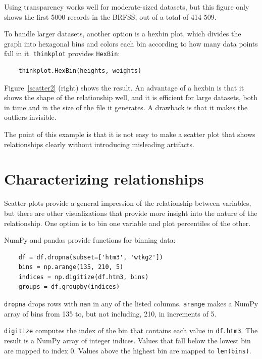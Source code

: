 \documentclass[12pt]{book}
\begin{document}
Using transparency works well for moderate-sized datasets, but this
figure only shows the first 5000 records in the BRFSS, out of a total
of 414 509.

To handle larger datasets, another option is a hexbin plot, which
divides the graph into hexagonal bins and colors each bin according to
how many data points fall in it.  {\tt thinkplot} provides 
{\tt HexBin}:
%
\begin{verbatim}
    thinkplot.HexBin(heights, weights)
\end{verbatim}
%
Figure~\ref{scatter2} (right) shows the result.  An advantage of a
hexbin is that it shows the shape of the relationship well, and it is
efficient for large datasets, both in time and in the size of the file
it generates.  A drawback is that it makes the outliers invisible.

The point of this example is that it is
not easy to make a scatter plot that shows relationships clearly
without introducing misleading artifacts.


\section{Characterizing relationships}
\label{characterizing}

Scatter plots provide a general impression of the relationship between
variables, but there are other visualizations that provide more
insight into the nature of the relationship.  One option is to bin one
variable and plot percentiles of the other.

NumPy and pandas provide functions for binning data:

\begin{verbatim}
    df = df.dropna(subset=['htm3', 'wtkg2'])
    bins = np.arange(135, 210, 5)
    indices = np.digitize(df.htm3, bins)
    groups = df.groupby(indices)
\end{verbatim}

{\tt dropna} drops rows with {\tt nan} in any of the listed columns.
{\tt arange} makes a NumPy array of bins from 135 to, but not including,
210, in increments of 5.

{\tt digitize} computes the index of the bin that contains each value
in {\tt df.htm3}.  The result is a NumPy array of integer indices.
Values that fall below the lowest bin are mapped to index 0.  Values
above the highest bin are mapped to {\tt len(bins)}.
\end{document}
